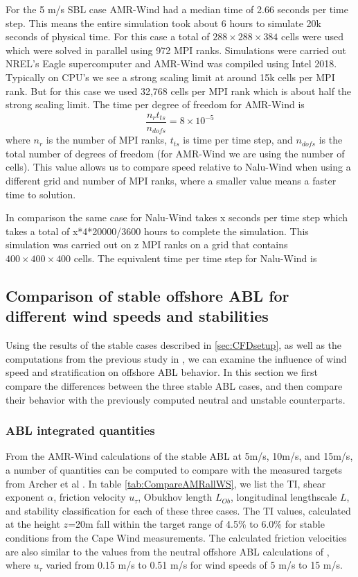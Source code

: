 For the 5 m/s SBL case AMR-Wind had a median time of 2.66 seconds per time step.
This means the entire simulation took about 6 hours to simulate 20k seconds 
of physical time. For this case a total of $288\times 288 \times 384$ cells were used 
which were solved in parallel using 972 MPI ranks. Simulations were carried out NREL's 
Eagle supercomputer and AMR-Wind was compiled using Intel 2018.
Typically on CPU's we see a strong scaling limit at around 15k cells per MPI rank. 
But for this case we used 32,768 cells per MPI rank which is about half the strong scaling limit.
The time per degree of freedom for AMR-Wind is
\[\frac{n_r t_{ts} }{n_{dofs}} = 8\times10^{-5}\]
where $n_r$ is the number of MPI ranks, $t_{ts}$ is time per time step, and $n_{dofs}$ is
the total number of degrees of freedom (for AMR-Wind we are using the number of cells).
This value allows us to compare speed relative to Nalu-Wind when using a different
grid and number of MPI ranks, where a smaller value means a faster time to solution.

In comparison the same case for Nalu-Wind takes x seconds per time step which
takes a total of x*4*20000/3600 hours to complete the simulation. This simulation was carried out 
on z MPI ranks on a grid that contains $400\times 400 \times 400$ cells. The equivalent
time per time step for Nalu-Wind is 

\subsection{Comparison of stable offshore ABL for different wind speeds and stabilities}

Using the results of the stable cases described in \ref{sec:CFDsetup},
as well as the computations from the previous study in
\cite{cheung2020large}, we can examine the influence of wind speed and
stratification on offshore ABL behavior.  In this section we first
compare the differences between the three stable ABL cases, and then
compare their behavior with the previously computed neutral and
unstable counterparts.

\subsubsection{\label{sec:stableABLStats} ABL integrated quantities}
From the AMR-Wind calculations of the stable ABL at 5m/s, 10m/s, and
15m/s, a number of quantities can be computed to compare with the
measured targets from Archer et al \cite{archer2016predominance}.  In
table \ref{tab:CompareAMRallWS}, we list the TI, shear exponent
$\alpha$, friction velocity $u_\tau$, Obukhov length $L_{Ob}$,
longitudinal lengthscale $L$, and stability classification for each of
these three cases.  The TI values, calculated at the height $z$=20m
fall within the target range of 4.5\% to 6.0\% for stable conditions
from the Cape Wind measurements.  The calculated friction velocities
are also similar to the values from the neutral offshore ABL
calculations of \cite{cheung2020large}, where $u_\tau$ varied from
0.15 m/s to 0.51 m/s for wind speeds of 5 m/s to 15 m/s.


